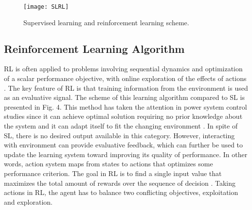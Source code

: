 \documentclass[journal]{IEEEtran}
\begin{document}
\begin{figure}
\centering
\texttt{[image: SLRL]}
\caption{Supervised learning and reinforcement learning scheme.}
\end{figure}


\subsection{Reinforcement Learning Algorithm}
RL is often applied to problems involving sequential dynamics and optimization of a scalar performance objective, with online exploration of the effects of actions \cite{Lendaris1984, Sutton1998, Rosenstein}. The key feature of RL is that training information from the environment is used as an evaluative signal. The scheme of this learning algorithm compared to SL is presented in Fig. 4. This method has taken the attention in power system control studies since it can achieve optimal solution requiring no prior knowledge about the system and it can adapt itself to fit the changing environment \cite{Rosenstein}. In spite of SL, there is no desired output available in this category. However, interacting with environment can provide evaluative feedback, which can further be used to update the learning system toward improving its quality of performance. In other words, action system maps from states to actions that optimizes some performance criterion. The goal in RL is to find a single input value that maximizes the total amount of rewards over the sequence of decision \cite{Barto}. Taking actions in RL, the agent has to balance two conflicting objectives, exploitation and exploration.
\end{document}
